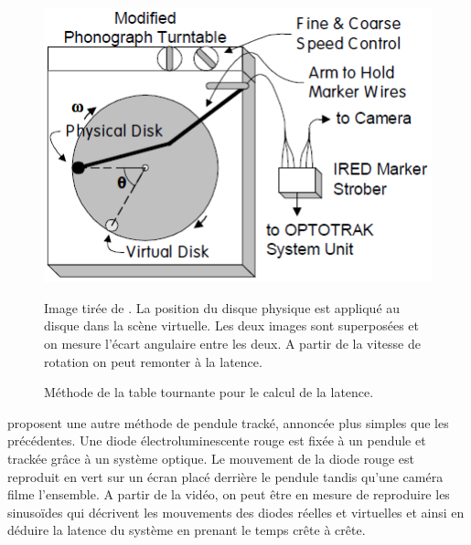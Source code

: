 	\begin{figure}
		\centering
		\includegraphics[scale=.75]{Figures/SwindellsPhonograph}
		\caption{Méthode de la table tournante pour le calcul de la latence.}{Image tirée de \citep{swindells_system_2000}. La position du disque physique est appliqué au disque dans la scène virtuelle. Les deux images sont superposées et on mesure l'écart angulaire entre les deux. A partir de la vitesse de rotation on peut remonter à la latence.}
		\label{fig:swindells_phonograph}
	\end{figure}
	
	\par \citep{steed_simple_2008} proposent une autre méthode de pendule tracké, annoncée plus simples que les précédentes. Une diode électroluminescente rouge est fixée à un pendule et trackée grâce à un système optique. Le mouvement de la diode rouge est reproduit en vert sur un écran placé derrière le pendule tandis qu'une caméra filme l'ensemble. A partir de la vidéo, on peut être en mesure de reproduire les sinusoïdes qui décrivent les mouvements des diodes réelles et virtuelles et ainsi en déduire la latence du système en prenant le temps crête à crête.
	

